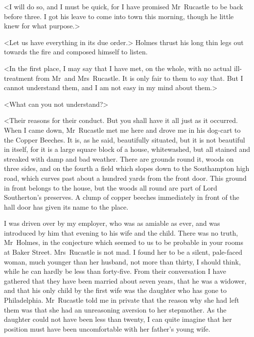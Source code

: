 <I will do so, and I must be quick, for I have promised Mr~Rucastle to be back before three. I got his leave to come into town this morning, though he little knew for what purpose.>

<Let us have everything in its due order.> Holmes thrust his long thin legs out towards the fire and composed himself to listen.

<In the first place, I may say that I have met, on the whole, with no actual ill-treatment from Mr~and Mrs~Rucastle. It is only fair to them to say that. But I cannot understand them, and I am not easy in my mind about them.>

<What can you not understand?>

<Their reasons for their conduct. But you shall have it all just as it occurred. When I came down, Mr~Rucastle met me here and drove me in his dog-cart to the Copper Beeches. It is, as he said, beautifully situated, but it is not beautiful in itself, for it is a large square block of a house, whitewashed, but all stained and streaked with damp and bad weather. There are grounds round it, woods on three sides, and on the fourth a field which slopes down to the Southampton high road, which curves past about a hundred yards from the front door. This ground in front belongs to the house, but the woods all round are part of Lord Southerton's preserves. A clump of copper beeches immediately in front of the hall door has given its name to the place.

I was driven over by my employer, who was as amiable as ever, and was introduced by him that evening to his wife and the child. There was no truth, Mr~Holmes, in the conjecture which seemed to us to be probable in your rooms at Baker Street. Mrs~Rucastle is not mad. I found her to be a silent, pale-faced woman, much younger than her husband, not more than thirty, I should think, while he can hardly be less than forty-five. From their conversation I have gathered that they have been married about seven years, that he was a widower, and that his only child by the first wife was the daughter who has gone to Philadelphia. Mr~Rucastle told me in private that the reason why she had left them was that she had an unreasoning aversion to her stepmother. As the daughter could not have been less than twenty, I can quite imagine that her position must have been uncomfortable with her father's young wife.

